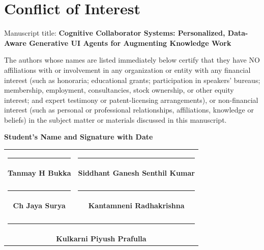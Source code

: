 \documentclass[12pt, a4paper]{report}
\begin{document}
\newpage
\chapter*{Conflict of Interest}

Manuscript title: \textbf{Cognitive Collaborator Systems: Personalized, Data-Aware Generative UI Agents for Augmenting Knowledge Work}

The authors whose names are listed immediately below certify that they have NO affiliations with or involvement in any organization or entity with any financial interest (such as honoraria; educational grants; participation in speakers’ bureaus; membership, employment, consultancies, stock ownership, or other equity interest; and expert testimony or patent-licensing arrangements), or non-financial interest (such as personal or professional relationships, affiliations, knowledge or beliefs) in the subject matter or materials discussed in this manuscript.

\vspace{2cm}
\noindent \textbf{Student’s Name and Signature with Date}


\vspace{1cm}
\begin{table}[H]
    \centering
    \begin{tabular}{cc}
    \rule{6cm}{1pt} & \rule{6cm}{1pt} \\
    \textbf{Tanmay H Bukka} & \textbf{Siddhant Ganesh Senthil Kumar} \\
    \vspace{1.5cm} & \vspace{1.5cm} \\
    \rule{6cm}{1pt} & \rule{6cm}{1pt} \\
    \textbf{Ch Jaya Surya} & \textbf{Kantamneni Radhakrishna} \\
    \vspace{1.5cm} & \vspace{1.5cm} \\
    \multicolumn{2}{c}{\rule{6cm}{1pt}} \\
    \multicolumn{2}{c}{\textbf{Kulkarni Piyush Prafulla}} \\
    \end{tabular}
\end{table}
\end{document}
